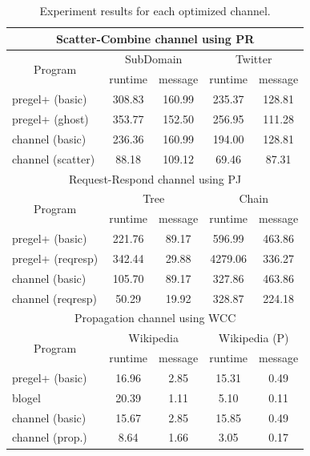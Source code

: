 \documentclass{sokendai_thesis} %
\newcommand{\PP}{Pregel+}
\begin{document}

\begin{table}[t]
\centering
\caption{Experiment results for each optimized channel.}
\label{tab:results}
\begin{tabular}{l|c|c|c|c}
\hline
\multicolumn{5}{c}{Scatter-Combine channel using PR} \\
\hline
\multicolumn{1}{c}{\multirow{2}{*}{Program}} & \multicolumn{2}{|c}{SubDomain} & \multicolumn{2}{|c}{Twitter} \\
\cline{2-5}
& \small runtime & \small message & \small runtime & \small message \\
\hline
pregel+ (basic) & 308.83 & 160.99 & 235.37 & 128.81 \\
\hline
pregel+ (ghost) & 353.77 & 152.50 & 256.95 & 111.28 \\
\hline
channel (basic) & 236.36 & 160.99 & 194.00 & 128.81 \\
\hline
channel (scatter) & 88.18 & 109.12 & 69.46 & 87.31 \\
\hline
\hline
\multicolumn{5}{c}{Request-Respond channel using PJ} \\
\hline
\multicolumn{1}{c}{\multirow{2}{*}{Program}} & \multicolumn{2}{|c}{Tree} & \multicolumn{2}{|c}{Chain} \\
\cline{2-5}
& \small runtime & \small message & \small runtime & \small message \\
\hline
pregel+ (basic) & 221.76 & 89.17  & 596.99 & 463.86  \\
\hline
pregel+ (reqresp) & 342.44 & 29.88  & 4279.06 & 336.27  \\
\hline
channel (basic) & 105.70 & 89.17  & 327.86 & 463.86  \\
\hline
channel (reqresp) & 50.29 & 19.92  & 328.87 & 224.18  \\
\hline
\hline
\multicolumn{5}{c}{Propagation channel using WCC} \\
\hline
\multicolumn{1}{c}{\multirow{2}{*}{Program}} & \multicolumn{2}{|c}{Wikipedia} & \multicolumn{2}{|c}{Wikipedia (P)} \\
\cline{2-5}
& \small runtime & \small message & \small runtime & \small message \\
\hline
pregel+ (basic) & 16.96 & 2.85  & 15.31 & 0.49  \\
\hline
blogel & 20.39 & 1.11  & 5.10 & 0.11  \\
\hline
channel (basic) & 15.67 & 2.85  & 15.85 & 0.49  \\
\hline
channel (prop.) & 8.64 & 1.66  & 3.05 & 0.17  \\
\hline
\end{tabular}
\end{table}
\end{document}
